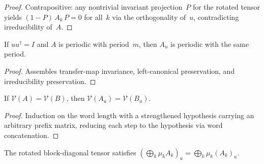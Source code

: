 \begin{proof}\leanok
    Contrapositive: any nontrivial invariant projection~$P$ for the
    rotated tensor yields $(1-P)\, A_k\, P = 0$ for all~$k$ via the
    orthogonality of~$u$, contradicting irreducibility of~$A$.
\end{proof}

\begin{theorem}%
    \label{thm:periodic_rotate_physical}
    \leanok
    If $u u^\dagger = I$ and $A$ is periodic with period~$m$, then
    $A_u$ is periodic with the same period.
\end{theorem}

\begin{proof}\leanok
    Assembles transfer-map invariance, left-canonical preservation, and
    irreducibility preservation.
\end{proof}

\begin{theorem}%
    \label{thm:same_mpv_rotate_physical}
    \leanok
    If $\mathcal{V}(A) = \mathcal{V}(B)$, then
    $\mathcal{V}(A_u) = \mathcal{V}(B_u)$.
\end{theorem}

\begin{proof}\leanok
    Induction on the word length with a strengthened hypothesis
    carrying an arbitrary prefix matrix, reducing each step to the
    hypothesis via word concatenation.
\end{proof}

\begin{theorem}%
    \label{thm:rotate_physical_blocks}
    \leanok
    The rotated block-diagonal tensor satisfies
    $(\bigoplus_k \mu_k A_k)_u
        = \bigoplus_k \mu_k (A_k)_u$.
\end{theorem}


